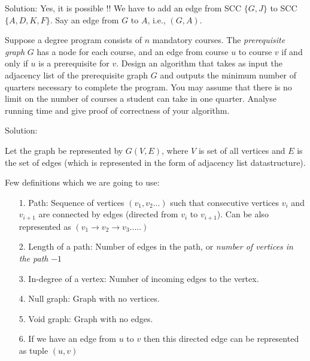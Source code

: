\documentclass[answers]{exam}
\begin{document}
\begin{questions}
\begin{parts}
\begin{solution}
Solution: Yes, it is possible !! We have to add an edge from SCC $ \{G,J\}$ to SCC $\{A,D,K,F\}$. Say an edge from $G$ to $A$, i.e., $(G,A)$.
\end{solution}

\end{parts}





\vspace{0.3in}













\question[18] Suppose a degree program consists of $n$ mandatory courses.
The {\em prerequisite graph} $G$ has a node for each course, and an edge from course $u$ to course $v$ if and only if $u$ is a prerequisite for $v$. Design an algorithm that takes as input the adjacency list of the prerequisite graph $G$ and outputs the minimum number of quarters necessary to complete the program. You may assume that there is no limit on the number of courses a student can take in one quarter. 
Analyse running time and give proof of correctness of your algorithm.

\begin{solution}
Solution: 

Let the graph be represented by $G(V,E)$, where $V$ is set of all vertices and $E$ is the set of edges (which is represented in the form of adjacency list datastructure).

Few definitions which we are going to use:
\begin{enumerate}
    \item [1.]Path: Sequence of vertices $(v_1,v_2...)$ such that consecutive vertices $v_i$ and $v_{i+1}$ are connected by edges (directed from $v_i$ to $v_{i+1}$).
    Can be also represented as $(v_1\rightarrow  v_2 \rightarrow v_3.....)$
    \item [2.] Length of a path: Number of edges in the path, or \textit{number of vertices in the path} $ -1$
    \item [3.]In-degree of a vertex: Number of incoming edges to the vertex.
    \item [4.]Null graph: Graph with no vertices.
    \item [5.]Void graph: Graph with no edges.
    \item [6.] If we have an edge from $u$ to $v$ then this directed edge can be represented as tuple $(u,v)$
\end{enumerate}


\end{solution}
\end{questions}
\end{document}
